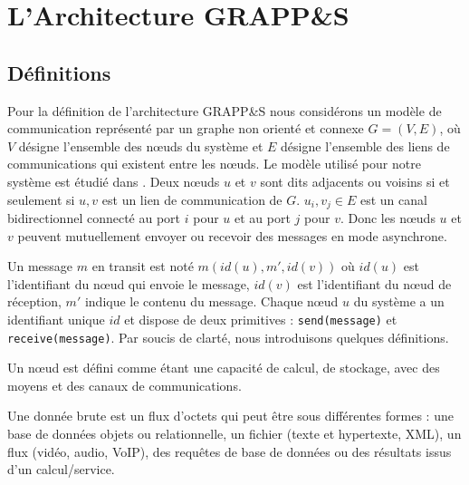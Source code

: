 \section{L'Architecture GRAPP\&S \label{SEC:GRAPPES}}

\subsection{Définitions\label{sec:Definitions}}
Pour la définition de l'architecture GRAPP\&S nous considérons un modèle de communication représenté par un  graphe non orienté  et connexe $G = (V, E)$, où $V$  désigne  l'ensemble  des  n{\oe}uds  du système et $E$ désigne l'ensemble des liens de communications qui existent entre les n{\oe}uds. Le modèle utilisé pour notre système est étudié dans \cite{Chalopin06}. Deux n{\oe}uds $u$ et $v$ sont dits adjacents ou voisins si et seulement si ${u, v}$ est un lien de communication de $G$. ${u_i, v_j} \in E$ est un canal bidirectionnel connecté au port $i$ pour $u$ et au port $j$ pour $v$. Donc les n{\oe}uds $u$ et $v$ peuvent mutuellement envoyer ou recevoir des messages en mode asynchrone. 

Un message $m$ en transit est noté $m(id(u), m', id(v))$ où  $id(u)$  est  l'identifiant du n{\oe}ud qui envoie le message, $id(v)$ est  l'identifiant du n{\oe}ud de réception, $m'$ indique le contenu du message. Chaque n{\oe}ud $u$ du système a un identifiant unique $id$ et  dispose de deux primitives : \texttt{send(message)} et \texttt{receive(message)}. Par soucis de clarté, nous introduisons quelques définitions.

\begin{definition}Un n{\oe}ud  est  défini  comme  étant une  capacité de calcul, de stockage, avec  des moyens et des canaux de communications.\end{definition}

\begin{definition}Une donnée  brute  est  un flux  d'octets qui peut être  sous  différentes formes : une base de données objets ou  relationnelle, un fichier (texte et hypertexte, XML), un flux (vidéo, audio, VoIP),  des  requêtes  de  base  de données ou des résultats issus d'un calcul/service.\end{definition}

